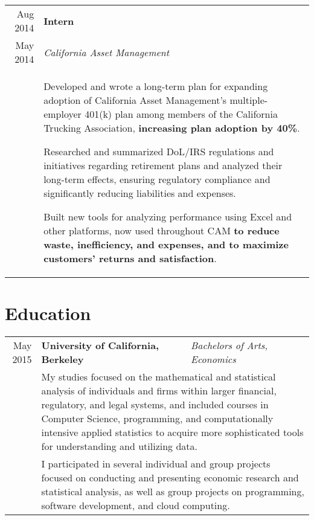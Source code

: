 \documentclass[10pt]{article}
\newcommand{\afterlistspace}[0]{\vspace{-1.5em}}
\begin{document}
\begin{tabular}{r|p{16cm}}
    Aug 2014 & \textbf{Intern}
    \\
    May 2014 & \emph{California Asset Management}
    \\
    & \begin{itemize}
        \footnotesize{

            \item Developed and wrote a long-term plan for expanding adoption of California Asset Management's multiple-employer 401(k) plan among members of the California Trucking Association, \textbf{increasing plan adoption by 40\%}.
            
            \item Researched and summarized DoL/IRS regulations and initiatives regarding retirement plans
            and analyzed their long-term effects, ensuring regulatory compliance and significantly reducing liabilities and expenses.
            
            \item Built new tools for analyzing performance using Excel and other platforms, now used throughout CAM \textbf{to reduce waste, inefficiency, and expenses, and to maximize customers' returns and satisfaction}.
        
        }

        \afterlistspace
    \end{itemize}

\end{tabular}


\section{Education}

\begin{tabular}{r|l|p{16cm}}
    May 2015 & \textbf{University of California, Berkeley} & \emph{Bachelors of Arts, Economics}
    \\
    & \multicolumn{2}{p{16cm}}{\footnotesize{My studies focused on the mathematical and statistical analysis of individuals and firms within larger financial, regulatory, and legal systems, and included courses in Computer Science, programming, and computationally intensive applied statistics to acquire more sophisticated tools for understanding and utilizing data.}}
    \\
    & \multicolumn{2}{p{16cm}}{\footnotesize{I participated in several individual and group projects focused on conducting and presenting economic research and statistical analysis, as well as group projects on programming, software development, and cloud computing.}}
\end{tabular}
\end{document}
